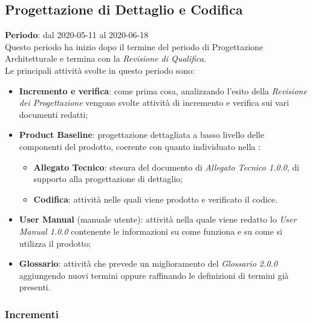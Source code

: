 \subsection{Progettazione di Dettaglio e Codifica}
\textbf{Periodo}: dal 2020-05-11 al 2020-06-18 \\
Questo periodo ha inizio dopo il termine del periodo di Progettazione Architetturale e termina con la \textit{Revisione di Qualifica}. \\
Le principali attività svolte in questo periodo sono:
\begin{itemize}
	\item \textbf{Incremento e verifica}: come prima cosa, analizzando l'esito della \textit{Revisione dei Progettazione} vengono svolte attività di incremento e verifica sui vari documenti redatti;
	\item \textbf{Product Baseline}: progettazione dettagliata a basso livello delle componenti del prodotto, coerente con quanto individuato nella \TB{}:
	\begin{itemize}
		\item \textbf{Allegato Tecnico}: stesura del documento di \textit{Allegato Tecnico 1.0.0}, di supporto alla progettazione di dettaglio;
		\item \textbf{Codifica}: attività nelle quali viene prodotto e verificato il codice.
	\end{itemize}
	\item \textbf{User Manual} (manuale utente): attività nella quale viene redatto lo \textit{User Manual 1.0.0} contenente le informazioni su come funziona e su come si utilizza il prodotto;
	\item \textbf{Glossario}: attività che prevede un miglioramento del \textit{Glossario 2.0.0} aggiungendo nuovi termini oppure raffinando le definizioni di termini già presenti.
\end{itemize}
	\subsubsection{Incrementi}
